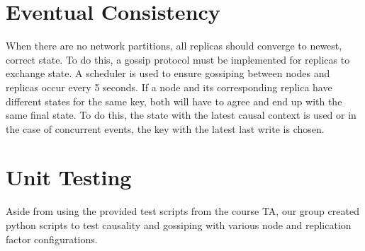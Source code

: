 \documentclass[12pt]{article}
\begin{document}
\section{Eventual Consistency}
When there are no network partitions, all replicas should converge to newest, correct state. To do this, a gossip protocol must be implemented for replicas to exchange state. A scheduler is used to ensure gossiping between nodes and replicas occur every 5 seconds. If a node and its corresponding replica have different states for the same key, both will have to agree and end up with the same final state. To do this, the state with the latest causal context is used or in the case of concurrent events, the key with the latest last write is chosen.
\section{Unit Testing}
Aside from using the provided test scripts from the course TA, our group created  python scripts to test causality and gossiping with various node and replication factor configurations. 
\end{document}
